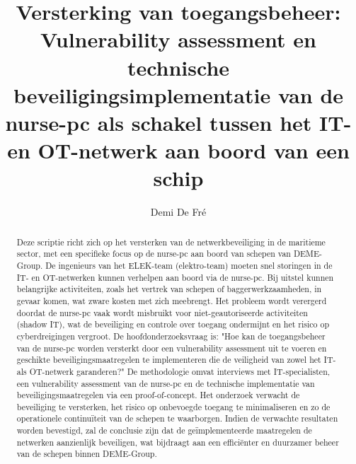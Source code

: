 \documentclass{hogent-article}
\title{Versterking van toegangsbeheer: Vulnerability assessment en 
technische beveiligingsimplementatie van de nurse-pc als schakel tussen het IT- en OT-netwerk aan boord van een schip}
\author{Demi De Fré}
\begin{document}
\begin{abstract}
  Deze scriptie richt zich op het versterken van de netwerkbeveiliging in de maritieme sector, met een specifieke focus op de nurse-pc aan boord van schepen van DEME-Group. 
  De ingenieurs van het ELEK-team (elektro-team) moeten snel storingen in de IT- en OT-netwerken kunnen verhelpen aan boord via de nurse-pc. 
  Bij uitstel kunnen belangrijke activiteiten, zoals het vertrek van schepen of baggerwerkzaamheden, in gevaar komen, wat zware kosten met zich meebrengt. 
  Het probleem wordt verergerd doordat de nurse-pc vaak wordt misbruikt voor niet-geautoriseerde activiteiten (shadow IT), wat de beveiliging en controle over toegang 
  ondermijnt en het risico op cyberdreigingen vergroot. De hoofdonderzoeksvraag is: "Hoe kan de toegangsbeheer van de nurse-pc worden versterkt door een vulnerability 
  assessment uit te voeren en geschikte beveiligingsmaatregelen te implementeren die de veiligheid van zowel het IT- als OT-netwerk garanderen?" 
  De methodologie omvat interviews met IT-specialisten, een vulnerability assessment van de nurse-pc en de technische implementatie van beveiligingsmaatregelen via een proof-of-concept. 
  Het onderzoek verwacht de beveiliging te versterken, het risico op onbevoegde toegang te minimaliseren en zo de operationele continuïteit van de schepen te waarborgen. 
  Indien de verwachte resultaten worden bevestigd, zal de conclusie zijn dat de geïmplementeerde maatregelen de netwerken aanzienlijk beveiligen, wat bijdraagt aan een efficiënter en duurzamer 
  beheer van de schepen binnen DEME-Group.
\end{abstract}

\tableofcontents



\printbibliography[heading=bibintoc]
\end{document}
